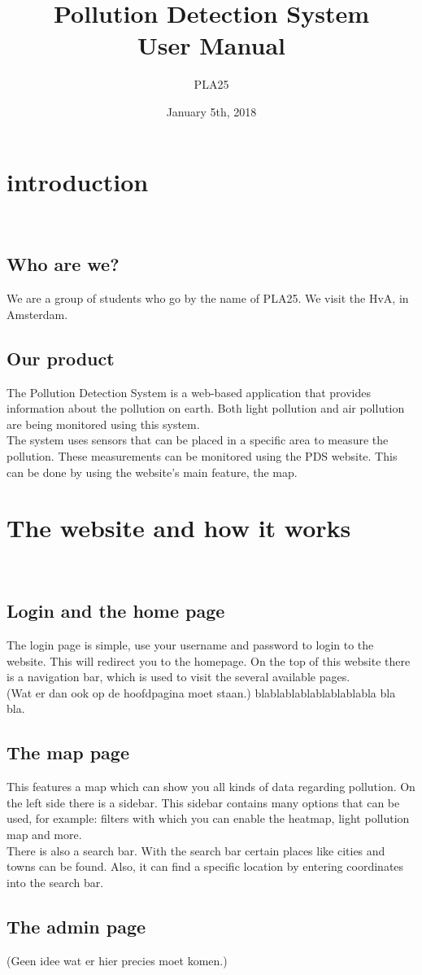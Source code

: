 \documentclass[a4paper]{article}
\title{Pollution Detection System\\User Manual}
\author{PLA25}
\date{January 5th, 2018}
\begin{document}
\clearpage
\maketitle
\thispagestyle{empty}
\setcounter{page}{0}
\pagebreak
\tableofcontents
\pagebreak

\section{introduction}
~\\

\subsection{Who are we?}
We are a group of students who go by the name of PLA25. We visit the HvA, in Amsterdam.
~\\

\subsection{Our product}
The Pollution Detection System is a web-based application that provides information about the pollution on earth. Both light pollution and air pollution are being monitored using this system.
\\
\indent
The system uses sensors that can be placed in a specific area to measure the pollution. These measurements can be monitored using the PDS website. This can be done by using the website's main feature, the map.

\pagebreak

\section{The website and how it works}
~\\

\subsection{Login and the home page}
The login page is simple, use your username and password to login to the website. This will redirect you to the homepage. On the top of this website there is a navigation bar, which is used to visit the several available pages.
\\
\indent
(Wat er dan ook op de hoofdpagina moet staan.) blablablablablablablabla bla bla.
~\\

\subsection{The map page}
This features a map which can show you all kinds of data regarding pollution. On the left side there is a sidebar. This sidebar contains many options that can be used, for example: filters with which you can enable the heatmap, light pollution map and more.
\\
\indent
There is also a search bar. With the search bar certain places like cities and towns can be found. Also, it can find a specific location by entering coordinates into the search bar.
~\\

\subsection{The admin page}
(Geen idee wat er hier precies moet komen.)
\end{document}

